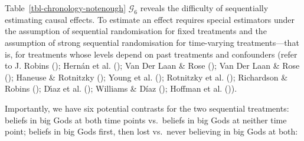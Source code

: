 \documentclass[
  single column]{article}
\begin{document}
Table~\ref{tbl-chronology-notenough} \(\mathcal{G}_6\) reveals the
difficulty of sequentially estimating causal effects. To estimate an
effect requires special estimators under the assumption of sequential
randomisation for fixed treatments and the assumption of strong
sequential randomisation for time-varying treatments---that is, for
treatments whose levels depend on past treatments and confounders (refer
to J. Robins (); Hernán et al.
(); Van Der Laan \& Rose
(); Van Der Laan \& Rose
(); Haneuse \& Rotnitzky
(); Young et al.
(); Rotnitzky et al.
(); Richardson \& Robins
(); Dı́az et al.
(); Williams \& Díaz
(); Hoffman et al.
()).

Importantly, we have six potential contrasts for the two sequential
treatments: beliefs in big Gods at both time points vs.~beliefs in big
Gods at neither time point; beliefs in big Gods first, then lost
vs.~never believing in big Gods at both:
\end{document}
